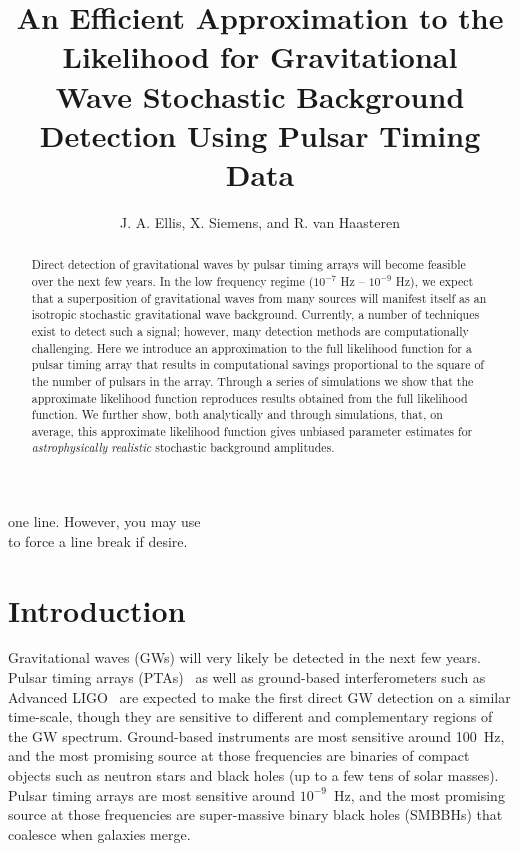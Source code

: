 \documentclass[iop]{emulateapj} \usepackage{apjfonts}
\begin{document}
one line. However, you may use \\ to force a line break if %
desire.

\title{An Efficient Approximation to the Likelihood for
Gravitational\\ Wave Stochastic Background Detection Using Pulsar
Timing Data}

\author{J. A. Ellis, X. Siemens, and
R. van Haasteren}



\begin{abstract} Direct detection of gravitational waves by pulsar
timing arrays will become feasible over the next few years. In the low
frequency regime ($10^{-7}$ Hz -- $10^{-9}$ Hz), we expect that a
superposition of gravitational waves from many sources will manifest
itself as an isotropic stochastic gravitational wave background.
Currently, a number of techniques exist to detect such a signal;
however, many detection methods are computationally challenging. Here
we introduce an approximation to the full likelihood function for a
pulsar timing array that results in computational savings proportional
to the square of the number of pulsars in the array. Through a series
of simulations we show that the approximate likelihood function
reproduces results obtained from the full likelihood function. We
further show, both analytically and through simulations, that, on
average, this approximate likelihood function gives unbiased parameter
estimates for \emph{astrophysically} \emph{realistic} stochastic
background amplitudes. \end{abstract}

\maketitle

\section{Introduction}

Gravitational waves (GWs) will very likely be detected in the next few
years. Pulsar timing arrays (PTAs)~\citep{haa+10} as well as
ground-based interferometers such as Advanced
LIGO~\citep{Waldman:2011vg} are expected to make the first direct GW
detection on a similar time-scale, though they are sensitive to
different and complementary regions of the GW spectrum. Ground-based
instruments are most sensitive around 100~Hz, and the most promising
source at those frequencies are binaries of compact objects such as
neutron stars and black holes (up to a few tens of solar masses).
Pulsar timing arrays are most sensitive around $10^{-9}$~Hz, and the
most promising source at those frequencies are super-massive binary
black holes (SMBBHs) that coalesce when galaxies merge.
\end{document}
